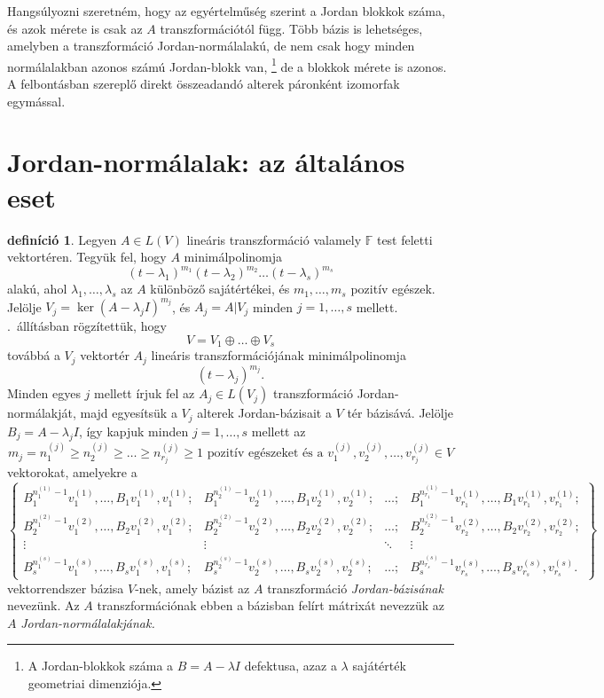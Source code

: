 \documentclass[9pt, a4paper, showtrims]{memoir}
\let\Aref\relax
\theoremstyle{plain}
\theoremstyle{remark}
\theoremstyle{definition}
\newtheorem{definition}[proposition]{definíció}
\begin{document}
Hangsúlyozni szeretném, hogy az egyértelműség szerint a Jordan blokkok száma, és azok mérete is csak
az $A$ transzformációtól függ.
Több bázis is lehetséges, amelyben a transzformáció Jordan-normálalakú,
de nem csak hogy minden normálalakban azonos számú Jordan-blokk van,
\footnote{A Jordan-blokkok száma a $B=A-\lambda I$ defektusa, azaz a $\lambda$ sajátérték
	geometriai dimenziója.}
de a blokkok mérete is azonos.
A felbontásban szereplő direkt összeadandó alterek páronként izomorfak egymással.
\section{Jordan-normálalak: az általános eset}
\begin{definition}
	Legyen $A\in L\left( V \right)$ lineáris transzformáció valamely $\mathbb{F}$ test
	feletti vektortéren.
	Tegyük fel, hogy $A$ minimálpolinomja
	\[
		\left( t-\lambda_1 \right)^{m_1}\left( t-\lambda_2 \right)^{m_2}\dots\left( t-\lambda_s \right)^{m_s}
	\]
	alakú, ahol $\lambda_1,\ldots,\lambda_s$ az $A$ különböző sajátértékei,
	és $m_1,\ldots,m_s$ pozitív egészek.
	Jelölje $V_j=\ker\left( A-\lambda_j I \right)^{m_j}$,
	és $A_j=A|V_j$ minden $j=1,\ldots,s$ mellett.
	\Aref{pr:redukcio-primfelbontas}.~állításban rögzítettük, hogy
	\[
		V=V_1\oplus\dots\oplus V_s
	\]
	továbbá a $V_j$ vektortér $A_j$ lineáris transzformációjának minimálpolinomja
	\[
		\left( t-\lambda_j \right)^{m_j}.
	\]
	Minden egyes $j$ mellett írjuk fel az $A_j\in L\left( V_j \right)$ transzformáció
	Jordan-normálakját,
	majd egyesítsük a $V_j$ alterek Jordan-bázisait a $V$ tér bázisává.
	Jelölje $B_j=A-\lambda_j I$,
	így kapjuk minden $j=1,\ldots,s$ mellett
	az
	\[
		m_j=n_1^{(j)}\geq n_2^{(j)}\geq\dots\geq n_{r_j}^{(j)}\geq 1
		\text{ pozitív egészeket és a }
		v_1^{(j)},v_2^{(j)},\ldots,v_{r_j}^{(j)}\in V
	\]
	vektorokat, amelyekre a
	\[
		\begin{Bmatrix}
			B_1^{n_1^{(1)}-1}v_1^{(1)},\ldots,B_1v_1^{(1)},v_1^{(1)};
			       &
			B_1^{n_2^{(1)}-1}v_2^{(1)},\ldots,B_1v_2^{(1)},v_2^{(1)};
			       &
			\dots ;
			       &
			B_1^{n_{r_1}^{(1)}-1}v_{r_1}^{(1)},\ldots,B_1v_{r_1}^{(1)},v_{r_1}^{(1)};
			\\
			B_2^{n_1^{(2)}-1}v_1^{(2)},\ldots,B_2v_1^{(2)},v_1^{(2)};
			       &
			B_2^{n_2^{(2)}-1}v_2^{(2)},\ldots,B_2v_2^{(2)},v_2^{(2)};
			       &
			\dots ;
			       &
			B_2^{n_{r_2}^{(2)}-1}v_{r_2}^{(2)},\ldots,B_2v_{r_2}^{(2)},v_{r_2}^{(2)};
			\\
			\vdots & \vdots & \ddots & \vdots
			\\
			B_s^{n_1^{(s)}-1}v_1^{(s)},\ldots,B_sv_1^{(s)},v_1^{(s)};
			       &
			B_s^{n_2^{(s)}-1}v_2^{(s)},\ldots,B_sv_2^{(s)},v_2^{(s)};
			       &
			\dots ;
			       &
			B_s^{n_{r_s}^{(s)}-1}v_{r_s}^{(s)},\ldots,B_sv_{r_s}^{(s)},v_{r_s}^{(s)}.
		\end{Bmatrix}
	\]
	vektorrendszer bázisa $V$-nek, amely bázist az $A$ transzformáció \emph{Jordan-bázisának} nevezünk.
	Az $A$ transzformációnak ebben a bázisban felírt mátrixát nevezzük az $A$ \emph{Jordan-normálalakjának.}
\end{definition}
\end{document}
